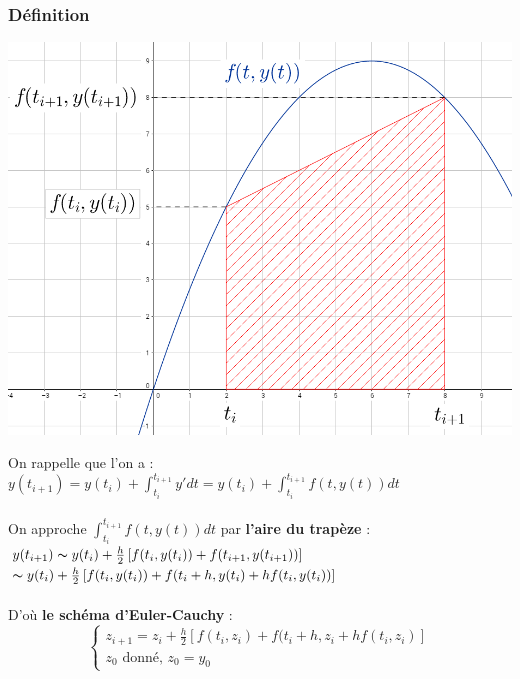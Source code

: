 \documentclass[a4paper,10pt]{report}
\begin{document}
\subsubsection{Définition}
\begin{minipage}{.36\linewidth}
\includegraphics[width=\textwidth]{trapeze.png}
\end{minipage} \hfill
\begin{minipage}{.02\linewidth}
\end{minipage} \hfill
\begin{minipage}{.56\linewidth}
On rappelle que l'on a :\\
$y(t_{i+1}) = y(t_i) + \int_{t_i}^{t_{i+1}} y'dt = y(t_i) + \int_{t_i}^{t_{i+1}} f(t,y(t))dt$\\ \\
On approche $\int_{t_i}^{t_{i+1}} f(t,y(t))dt$ par \textbf{l'aire du trapèze} :
\abovedisplayskip=0mm
$y(t_{i+1}) \thicksim y(t_i)+\frac{h}{2} \left[ f(t_i,y(t_i)) + f(t_{i+1},y(t_{i+1})) \right]$ \\
$\thicksim y(t_i)+\frac{h}{2} \left[ f(t_i,y(t_i)) + f(t_i+h,y(t_i)+hf(t_i,y(t_i)) \right]$\\ \\
D'où \textbf{le schéma d'Euler-Cauchy} :\\
\begin{equation}
\left\lbrace
\begin{array}{l}
z_{i+1}=z_i+\frac{h}{2} \left[ f(t_i,z_i) + f(t_i+h,z_i+hf(t_i,z_i) \right] \\
z_0 \text{ donné, } z_0=y_0
\end{array}\right.
\end{equation}
\end{minipage}
\end{document}
